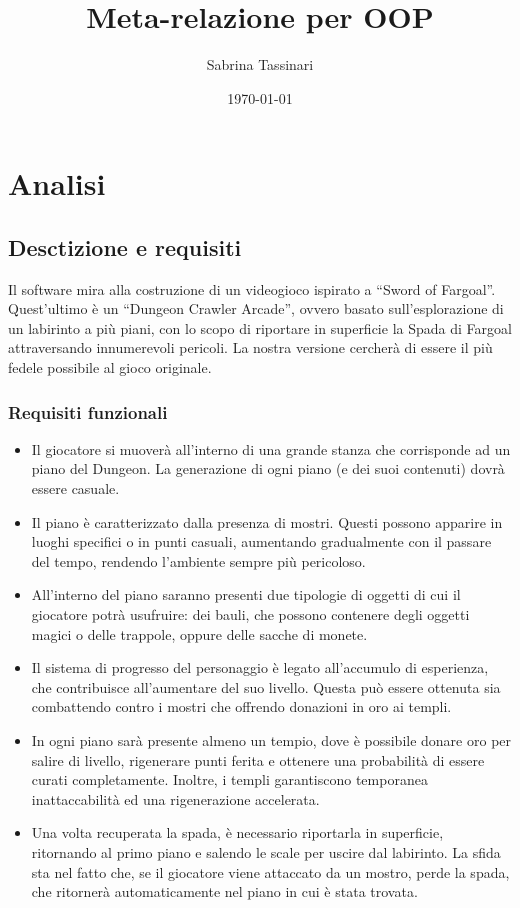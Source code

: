 \documentclass{report}
\title{Meta-relazione per OOP}
\author{Sabrina Tassinari}
\date{\today}
\begin{document}
\maketitle

\tableofcontents

\chapter{Analisi}

\section{Desctizione e requisiti}

Il software mira alla costruzione di un videogioco ispirato a “Sword of Fargoal”. 
%
Quest’ultimo è un “Dungeon Crawler Arcade”, ovvero basato sull’esplorazione di un labirinto a più piani, con lo scopo di riportare in superficie la Spada di Fargoal attraversando innumerevoli pericoli. 
%
La nostra versione cercherà di essere il più fedele possibile al gioco originale.

\subsection*{Requisiti funzionali}
\begin{itemize}
    \item Il giocatore si muoverà all’interno di una grande stanza che corrisponde ad un piano del Dungeon. La generazione di ogni piano (e dei suoi contenuti) dovrà essere casuale.
    \item Il piano è caratterizzato dalla presenza di mostri. Questi possono apparire in luoghi specifici o in punti casuali, aumentando gradualmente con il passare del tempo, rendendo l’ambiente sempre più pericoloso.
    \item All’interno del piano saranno presenti due tipologie di oggetti di cui il giocatore potrà usufruire: dei bauli, che possono contenere degli oggetti magici o delle trappole, oppure delle sacche di monete.
    \item Il sistema di progresso del personaggio è legato all’accumulo di esperienza, che contribuisce all’aumentare del suo livello. Questa può essere ottenuta sia combattendo contro i mostri che offrendo donazioni in oro ai templi.
    \item In ogni piano sarà presente almeno un tempio, dove è possibile donare oro per salire di livello, rigenerare punti ferita e ottenere una probabilità di essere curati completamente. Inoltre, i templi garantiscono temporanea inattaccabilità ed una rigenerazione accelerata.
    \item Una volta recuperata la spada, è necessario riportarla in superficie, ritornando al primo piano e salendo le scale per uscire dal labirinto. La sfida sta nel fatto che, se il giocatore viene attaccato da un mostro, perde la spada, che ritornerà automaticamente nel piano in cui è stata trovata.
\end{itemize}
\end{document}

